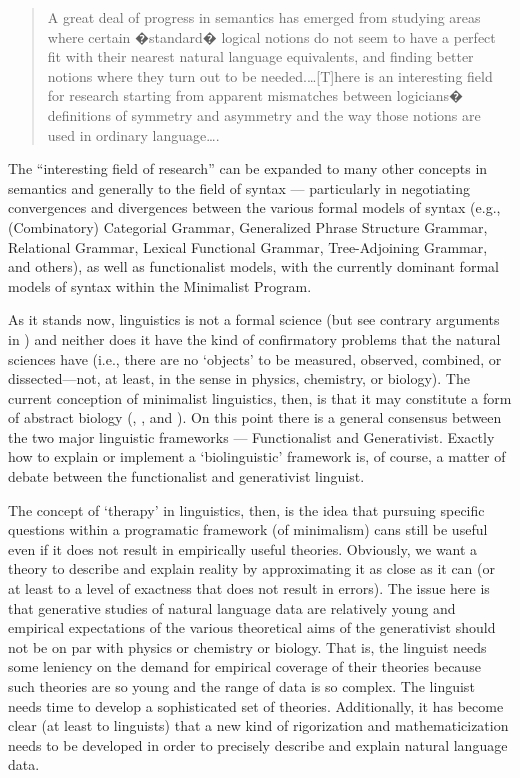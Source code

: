 \documentclass[11pt]{article}
\begin{document}
\begin{quote}
A great deal of progress in semantics has emerged from studying areas where certain
�standard� logical notions do not seem to have a perfect fit with their nearest natural language
equivalents, and finding better notions where they turn out to be needed.\ldots [T]here is an interesting field for research starting from apparent mismatches between logicians� definitions of symmetry and asymmetry and the way those notions are used in ordinary language\ldots.
\end{quote}

The ``interesting field of research'' can be expanded to many other concepts in semantics and generally to the field of syntax --- particularly in negotiating convergences and divergences between the various formal models of syntax (e.g., (Combinatory) Categorial Grammar, Generalized Phrase Structure Grammar, Relational Grammar, Lexical Functional Grammar, Tree-Adjoining Grammar, and others), as well as functionalist models, with the currently dominant formal models of syntax within the Minimalist Program. 

As it stands now, linguistics is not a formal science (but see contrary arguments in \citealt{katz:1998}) and neither does it have the kind of confirmatory problems that the natural sciences have (i.e., there are no `objects' to be measured, observed, combined, or dissected---not, at least, in the sense in physics, chemistry, or biology). The current conception of minimalist linguistics, then, is that it may constitute a form of abstract biology (\citealt{boeckxpp:2005}, \citealt{chomsky07ofminds}, and \citealt{ppuri:2008}). On this point there is a general consensus between the two major linguistic frameworks --- Functionalist and Generativist. Exactly how to explain or implement a `biolinguistic' framework is, of course, a matter of debate between the functionalist and generativist linguist. 

The concept of `therapy' in linguistics, then, is the idea that pursuing specific questions within a programatic framework (of minimalism) cans still be useful even if it does not result in empirically useful theories. Obviously, we want a theory to describe and explain reality by approximating it as close as it can (or at least to a level of exactness that does not result in errors). The issue here is that generative studies of natural language data are relatively young and empirical expectations of the various theoretical aims of the generativist should not be on par with physics or chemistry or biology. That is, the linguist needs some leniency on the demand for empirical coverage of their theories because such theories are so young and the range of data is so complex. The linguist needs time to develop a sophisticated set of theories. Additionally, it has become clear (at least to linguists) that a new kind of rigorization and mathematicization needs to be developed in order to precisely describe and explain natural language data.      
\end{document}
